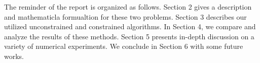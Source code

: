 The reminder of the report is organized as follows. Section 2 gives a description and mathematicla formualtion for these two problems. Section 3 describes our utilized unconstrained and constrained algorithms. In Section 4, we compare and analyze the results of these methods. Section 5 presents in-depth discussion on a variety of numerical experiments. We conclude in Section 6 with some future works.